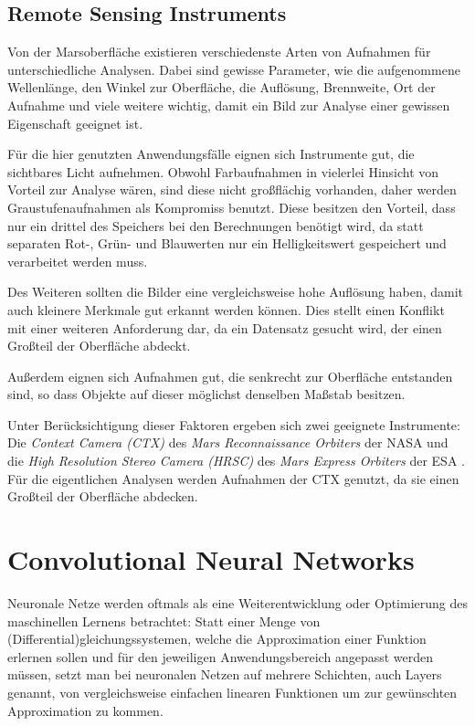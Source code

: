 \subsection{Remote Sensing Instruments}
\label{ssec:mars_images}

Von der Marsoberfläche existieren verschiedenste Arten von Aufnahmen für unterschiedliche Analysen. Dabei sind gewisse Parameter, wie \zB die aufgenommene Wellenlänge, den Winkel zur Oberfläche, die Auflösung, Brennweite, Ort der Aufnahme und viele weitere wichtig, damit ein Bild zur Analyse einer gewissen Eigenschaft geeignet ist.

Für die hier genutzten Anwendungsfälle eignen sich Instrumente gut, die sichtbares Licht aufnehmen. Obwohl Farbaufnahmen in vielerlei Hinsicht von Vorteil zur Analyse wären, sind diese nicht großflächig vorhanden, daher werden Graustufenaufnahmen als Kompromiss benutzt. Diese besitzen den Vorteil, dass nur ein drittel des Speichers bei den Berechnungen benötigt wird, da statt separaten Rot-, Grün- und Blauwerten nur ein Helligkeitswert gespeichert und verarbeitet werden muss.

Des Weiteren sollten die Bilder eine vergleichsweise hohe Auflösung haben, damit auch kleinere Merkmale gut erkannt werden können. Dies stellt einen Konflikt mit einer weiteren Anforderung dar, da ein Datensatz gesucht wird, der einen Großteil der Oberfläche abdeckt.

Außerdem eignen sich Aufnahmen gut, die senkrecht zur Oberfläche entstanden sind, so dass Objekte auf dieser möglichst denselben Maßstab besitzen.

Unter Berücksichtigung dieser Faktoren ergeben sich \ua zwei geeignete Instrumente:
Die \textit{Context Camera (CTX)} des \textit{Mars Reconnaissance Orbiters} der NASA \cite{malin_07} und die \textit{High Resolution Stereo Camera (HRSC)} des \textit{Mars Express Orbiters} der ESA \cite{hrsc}. Für die eigentlichen Analysen werden Aufnahmen der CTX genutzt, da sie einen Großteil der Oberfläche abdecken.%

\section{Convolutional Neural Networks}
\label{sec:cnn}

Neuronale Netze werden oftmals als eine Weiterentwicklung oder Optimierung des maschinellen Lernens betrachtet: Statt einer Menge von (Differential)gleichungssystemen, welche die Approximation einer Funktion erlernen sollen und \ggf für den jeweiligen Anwendungsbereich angepasst werden müssen, setzt man bei neuronalen Netzen auf mehrere Schichten, auch Layers genannt, von vergleichsweise einfachen linearen Funktionen um zur gewünschten Approximation zu kommen. \cite{hardesty_17}

